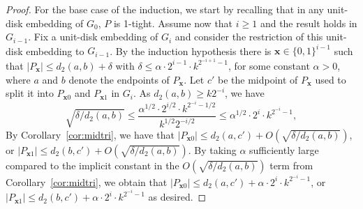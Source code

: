 \documentclass[a4paper,reqno, 12pt]{amsart}
\begin{document}
\begin{proof}
For the base case of the induction, we start by recalling that  in any
unit-disk embedding of $G_0$, $P$ is 1-tight. Assume now that $i\ge 1$ and the
result holds in $G_{i-1}$. Fix a unit-disk embedding of $G_i$ and
consider the restriction of this unit-disk embedding to
$G_{i-1}$. By the induction hypothesis there is $\mathbf{x}\in
\{0,1\}^{i-1}$ such that $|P_\mathbf{x}|\le d_2(a,b)+\delta$ with
$\delta\le \alpha\cdot 2^{i-1}\cdot k^{2^{-i+1}-1}$, for some
constant $\alpha>0$, where $a$ and $b$ denote the endpoints of $P_\mathbf{x}$. Let $c'$ be the midpoint of $P_\mathbf{x}$ used
to split it into $P_{\mathbf{x}0}$ and $P_{\mathbf{x}1}$  in $G_i$. As $d_2(a,b)\ge k2^{-i}$, we have
\[\sqrt{\delta/d_2(a,b)}\le\frac{\alpha^{1/2}\cdot 2^{i/2}\cdot
    k^{2^{-i}-1/2}}{k^{1/2}2^{-i/2}}\le  \alpha^{1/2}\cdot 2^{i}\cdot
    k^{2^{-i}-1},
  \]
  By Corollary~\ref{cor:midtri}, we have that $|P_{\mathbf{x}0}|\le d_2(a,c')+O(\sqrt{\delta/d_2(a,b)})$, or  $|P_{\mathbf{x}1}|\le d_2(b,c')+O(\sqrt{\delta/d_2(a,b)})$.
  By taking $\alpha$ sufficiently large
  compared to the implicit
constant in the $O(\sqrt{\delta/d_2(a,b)})$ term from
Corollary~\ref{cor:midtri}, we obtain that
$|P_{\mathbf{x}0}|\le d_2(a,c')+\alpha\cdot 2^{i}\cdot k^{2^{-i}-1}$, or
$|P_{\mathbf{x}1}|\le d_2(b,c')+\alpha\cdot 2^{i}\cdot k^{2^{-i}-1}$ as desired.
\end{proof}

\lemregpath*
\end{document}
